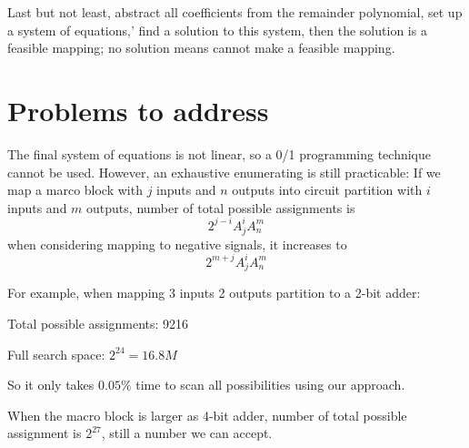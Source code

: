 \documentclass[conference,10pt]{IEEEtran}
\begin{document}
Last but not least, abstract all coefficients from the remainder polynomial, set up a system of equations,'
find a solution to this system, then the solution is a feasible mapping; no solution means cannot make a
feasible mapping.

\section{Problems to address}
The final system of equations is not linear, so a 0/1 programming technique cannot be used. However,
an exhaustive enumerating is still practicable:
If we map a marco block with $j$ inputs and $n$ outputs into circuit partition with $i$ inputs
and $m$ outputs, number of total possible assignments is
$$2^{j-i}A_j^iA_n^m$$
when considering mapping to negative signals, it increases to 
$$2^{m+j}A_j^iA_n^m$$

For example, when mapping 3 inputs 2 outputs partition to a 2-bit adder:

Total possible assignments: 9216

Full search space: $2^{24} = 16.8M$

So it only takes $0.05\%$ time to scan all possibilities using our approach.

When the macro block is larger as 4-bit adder, number of total possible assignment is $2^{27}$,
still a number we can accept.
\end{document}
